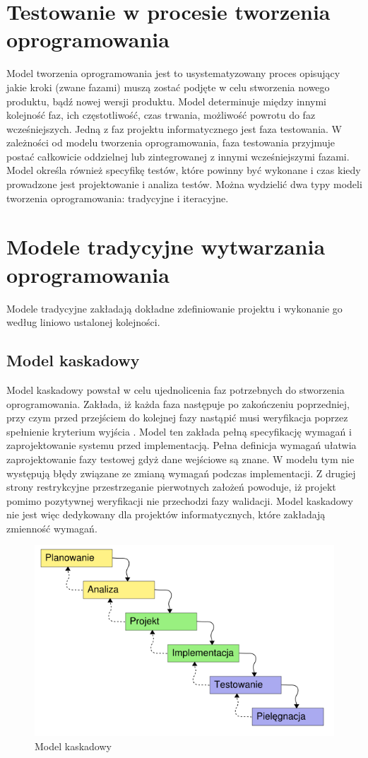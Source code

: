 \section{Testowanie w procesie tworzenia oprogramowania}
\label{sec:testowanieWprocesie}
Model tworzenia oprogramowania jest to usystematyzowany proces opisujący jakie kroki (zwane fazami) muszą zostać podjęte w celu stworzenia nowego produktu, bądź nowej wersji produktu. Model determinuje między innymi kolejność faz, ich częstotliwość, czas trwania, możliwość powrotu do faz wcześniejszych. Jedną z faz projektu informatycznego jest faza testowania. W zależności od modelu tworzenia oprogramowania, faza testowania przyjmuje postać całkowicie oddzielnej lub zintegrowanej z innymi wcześniejszymi fazami. Model określa również specyfikę testów, które powinny być wykonane  i czas kiedy prowadzone jest projektowanie i analiza testów.
Można wydzielić dwa typy modeli tworzenia oprogramowania: tradycyjne i iteracyjne.  
\section{Modele tradycyjne wytwarzania oprogramowania}
Modele tradycyjne zakładają dokładne zdefiniowanie projektu i wykonanie go według liniowo ustalonej kolejności.
\subsection{Model kaskadowy}
Model kaskadowy powstał w celu ujednolicenia faz potrzebnych do stworzenia oprogramowania. Zakłada, iż każda faza następuje po zakończeniu poprzedniej, przy czym przed przejściem do kolejnej fazy nastąpić musi weryfikacja poprzez spełnienie kryterium wyjścia \cite{SEaT}. Model ten zakłada pełną specyfikację wymagań i zaprojektowanie systemu przed implementacją. Pełna definicja wymagań ułatwia zaprojektowanie fazy testowej gdyż dane wejściowe są znane. W modelu tym nie występują błędy związane ze zmianą wymagań podczas implementacji. Z drugiej strony restrykcyjne przestrzeganie pierwotnych założeń powoduje, iż projekt pomimo pozytywnej weryfikacji nie przechodzi fazy walidacji. Model kaskadowy nie jest więc dedykowany dla projektów informatycznych, które zakładają zmienność wymagań.
\begin{figure}[h]
\centerline{\includegraphics[scale=0.4]{img/model_kaskadowy.png}}
\caption{Model kaskadowy}
\label{fig:kaskadowy}
\end{figure}

